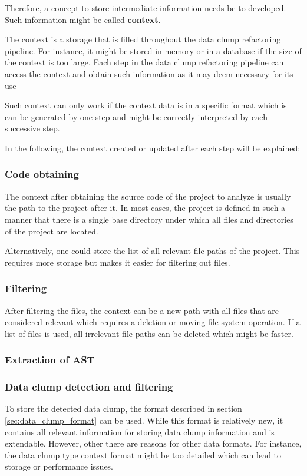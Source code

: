 Therefore, a concept to store intermediate information needs be to developed. Such information might be called \textbf{context}.

The context is a storage that is filled throughout the data clump refactoring pipeline. For instance, it might be stored in memory or in a database if the size of the context is too large. Each step in the data clump refactoring pipeline can access the context and obtain such information as it may deem necessary for its use

Such context can only work if the context data is in a specific format which is can be generated by one step and might be correctly interpreted by each successive step. 

In the following, the context created or updated after each step will be explained:

\subsubsection{Code obtaining}
The context after obtaining the source code of the project to analyze is  usually the path to the project after it. In most cases, the project is defined in such a manner that there is a single base directory under which all files and directories of the project are located.

Alternatively, one could store the list of all relevant file paths of the project. This requires more storage but makes it easier for filtering out files.

\subsubsection{Filtering}
After filtering the files, the context can be a new path with all files that are considered relevant which requires a deletion or moving file system operation. If a list of files is used, all irrelevant file paths can be deleted which might be faster.

\subsubsection{Extraction of AST}
\subsubsection{Data clump detection and filtering}

To store the detected data clump, the format described in section \ref{sec:data_clump_format} can be used. While this format is relatively new, it contains all relevant information for storing data clump information and is extendable. However, other there are reasons for other data formats. For instance,  the data clump type context format might be too detailed which can lead to storage or performance issues. 

